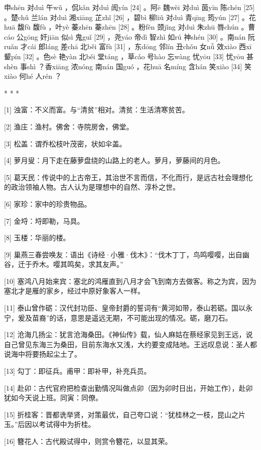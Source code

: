 \documentclass[12pt,UTF8]{ctexbook}
\begin{document}
申shēn 对duì 午wǔ ，侃kǎn 对duì 訚yín [24] 。阿ē 魏wèi 对duì 茵yīn 陈chén [25] 。楚chǔ 兰lán 对duì 湘xiāng 芷zhǐ [26] ，碧bì 柳liǔ 对duì 青qīng 筠yún [27] 。花huā 馥fù 馥fù ，叶yè 蓁zhēn 蓁zhēn [28] 。粉fěn 颈jǐng 对duì 朱zhū 唇chún 。曹cáo 公gōng 奸jiān 似sì 鬼guǐ [29] ，尧yáo 帝dì 智zhì 如rú 神shén [30] 。南nán 阮ruǎn 才cái 郎láng 差chā 北běi 富fù [31] ，东dōng 邻lín 丑chǒu 女nǚ 效xiào 西xī 颦pín [32] 。色sè 艳yàn 北běi 堂táng ，草cǎo 号hào 忘wàng 忧yōu [33] 忧yōu 甚shèn 事shì ？香xiāng 浓nóng 南nán 国guó ，花huā 名míng 含hán 笑xiào [34] 笑xiào 何hé 人rén ？



* * *



[1] 浊富：不义而富。与“清贫”相对。清贫：生活清寒贫苦。

[2] 渔庄：渔村。佛舍：寺院房舍，佛堂。

[3] 松盖：谓乔松枝叶茂密，状如伞盖。

[4] 萝月叟：月下走在藤萝盘绕的山路上的老人。萝月，萝藤间的月色。

[5] 葛天民：传说中的上古帝王，其治世不言而信，不化而行，是远古社会理想化的政治领袖人物。古人认为是理想中的自然、淳朴之世。

[6] 家珍：家中的珍贵物品。

[7] 金埒：埒即勒，马具。

[8] 玉楼：华丽的楼。

[9] 巢燕三春尝唤友：语出《诗经·小雅·伐木》：“伐木丁丁，鸟鸣嘤嘤，出自幽谷，迁于乔木。嘤其鸣矣，求其友声。”

[10] 塞鸿八月始来宾：塞北的鸿雁直到八月才会飞到南方去做客。称之为宾，因为塞北才是雁的家乡，经过中原好象客人一样。

[11] 泰山曾作砺：汉代封功臣、皇帝封爵的誓词有“黄河如带，泰山若砺。国以永宁，爰及苗裔”的话，意思是遥远无期，不可能出现的情况。砺，磨刀石。

[12] 沧海几扬尘：犹言沧海桑田。《神仙传》载，仙人麻姑在蔡经家见到王远，说自己曾见东海三为桑田，目前东海水又浅，大约要变成陆地。王远叹息说：圣人都说海中将要扬起尘土了。

[13] 勾丁：即征兵。甫甲：即补甲，补充兵员。

[14] 赴卯：古代官府把检查出勤情况叫做点卯（因为卯时日出，开始工作），赴卯犹如今天说上班。同寅：同僚。

[15] 折桂客：晋都诜举贤，对策最优，自己夸口说：“犹桂林之一枝，昆山之片玉。”后因以考试得中为折桂。

[16] 簪花人：古代殿试得中，则赏令簪花，以显其荣。
\end{document}
